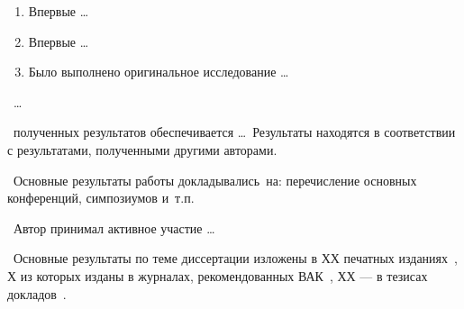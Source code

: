\novelty
\begin{enumerate}
  \item Впервые \ldots
  \item Впервые \ldots
  \item Было выполнено оригинальное исследование \ldots
\end{enumerate}

\influence\ \ldots

\reliability\ полученных результатов обеспечивается \ldots \ Результаты находятся в соответствии с результатами, полученными другими авторами.

\probation\
Основные результаты работы докладывались~на:
перечисление основных конференций, симпозиумов и~т.\:п.

\contribution\ Автор принимал активное участие \ldots

\publications\ Основные результаты по теме диссертации изложены в ХХ печатных изданиях~\cite{Sokolov,Gaidaenko,Lermontov,Management},
Х из которых изданы в журналах, рекомендованных ВАК~\cite{Sokolov,Gaidaenko}, 
ХХ --- в тезисах докладов~\cite{Lermontov,Management}.

